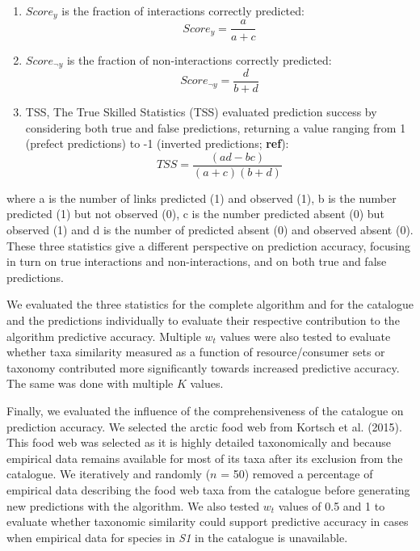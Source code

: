 \documentclass[letterpaper]{article}
\begin{document}
\begin{enumerate}
 \item $Score_y$ is the fraction of interactions correctly predicted:
     \begin{equation}
         Score_y = \frac{a}{a + c}
     \end{equation}

 \item $Score_{\neg y}$ is the fraction of non-interactions correctly predicted:
     \begin{equation}
       Score_{\neg y}  = \frac{d}{b + d}
     \end{equation}

 \item TSS, The True Skilled Statistics (TSS) evaluated prediction success by considering both true and false predictions, returning a value ranging from 1 (prefect predictions) to -1 (inverted predictions; \textbf{ref}): %
     \begin{equation}
       TSS = \frac{(ad - bc)}{(a + c)(b + d)}
     \end{equation}
\end{enumerate}

where a is the number of links predicted (1) and observed (1), b is the number predicted (1) but not observed (0), c is the number predicted absent (0) but observed (1) and d is the number of predicted absent (0) and observed absent (0). These three statistics give a different perspective on prediction accuracy, focusing in turn on true interactions and non-interactions, and on both true and false predictions.

We evaluated the three statistics for the complete algorithm and for the catalogue and the predictions individually to evaluate their respective contribution to the algorithm predictive accuracy. Multiple $w_t$ values were also tested to evaluate whether taxa similarity measured as a function of resource/consumer sets or taxonomy contributed more significantly towards increased predictive accuracy. The same was done with multiple $K$ values.

Finally, we evaluated the influence of the comprehensiveness of the catalogue on prediction accuracy. We selected the arctic food web from Kortsch et al. (2015). This food web was selected as it is highly detailed taxonomically and because empirical data remains available for most of its taxa after its exclusion from the catalogue. We iteratively and randomly ($n$ = 50) removed a percentage of empirical data describing the food web taxa from the catalogue before generating new predictions with the algorithm. We also tested $w_t$ values of 0.5 and 1 to evaluate whether taxonomic similarity could support predictive accuracy in cases when empirical data for species in \textit{S1} in the catalogue is unavailable.
\end{document}
